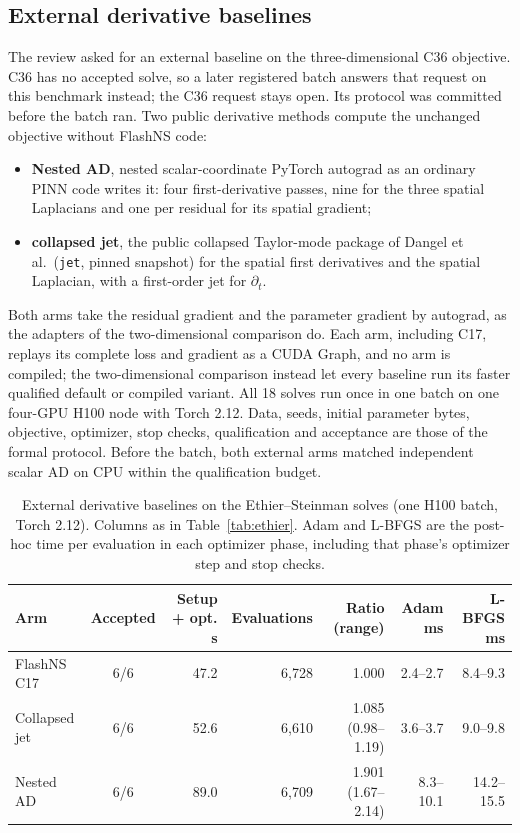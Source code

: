 \documentclass[11pt]{article}
\begin{document}
\subsection{External derivative baselines}\label{sec:ethierext}
The review asked for an external baseline on the three-dimensional C36
objective. C36 has no accepted solve, so a later registered batch answers
that request on this benchmark instead; the C36 request stays open. Its
protocol was committed before the batch ran. Two public derivative methods
compute the unchanged objective without FlashNS code:
\begin{itemize}
\item \textbf{Nested AD}, nested scalar-coordinate PyTorch autograd as an
  ordinary PINN code writes it: four first-derivative passes, nine for the
  three spatial Laplacians and one per residual for its spatial gradient;
\item \textbf{collapsed jet}, the public collapsed Taylor-mode package of
  Dangel et al.\ (\texttt{jet}, pinned snapshot) for the spatial first
  derivatives and the spatial Laplacian, with a first-order jet for
  $\partial_t$.
\end{itemize}
Both arms take the residual gradient and the parameter gradient by
autograd, as the adapters of the two-dimensional comparison do. Each arm, including C17,
replays its complete loss and gradient as a CUDA Graph, and no arm is
compiled; the two-dimensional comparison instead let every baseline run its
faster qualified default or compiled variant. All 18 solves run once
in one batch on one four-GPU H100 node with Torch 2.12. Data, seeds,
initial parameter bytes, objective, optimizer, stop checks, qualification
and acceptance are those of the formal protocol. Before the batch, both
external arms matched independent scalar AD on CPU within the
qualification budget.

\begin{table}[htbp]\centering\small
\setlength{\tabcolsep}{4pt}
\caption{External derivative baselines on the Ethier--Steinman solves (one H100 batch, Torch 2.12). Columns as in Table~\ref{tab:ethier}. Adam and L-BFGS are the post-hoc time per evaluation in each optimizer phase, including that phase's optimizer step and stop checks.}
\label{tab:ethierext}
\begin{tabular}{lcrrrrr}\toprule
Arm & Accepted & Setup + opt. s & Evaluations & Ratio (range) & Adam ms & L-BFGS ms\\\midrule
FlashNS C17 & 6/6 & 47.2 & 6,728 & 1.000 & 2.4--2.7 & 8.4--9.3\\
Collapsed jet & 6/6 & 52.6 & 6,610 & 1.085 (0.98--1.19) & 3.6--3.7 & 9.0--9.8\\
Nested AD & 6/6 & 89.0 & 6,709 & 1.901 (1.67--2.14) & 8.3--10.1 & 14.2--15.5\\
\bottomrule\end{tabular}
\end{table}
\end{document}
